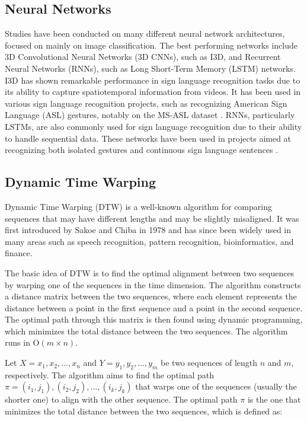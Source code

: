 \documentclass[final,rdr32.tex]{subfiles}
\begin{document}
\subsection{Neural Networks}

Studies have been conducted on many different neural network architectures, focused
on mainly on image classification. The best performing networks include 3D Convolutional Neural Networks (3D CNNs), such as I3D, and Recurrent Neural Networks (RNNs), such as Long Short-Term Memory (LSTM) networks. I3D has shown remarkable performance in sign language recognition tasks due to its ability to capture spatiotemporal information from videos. It has been used in various sign language recognition projects, such as recognizing American Sign Language (ASL) gestures, notably on the MS-ASL dataset \cite{joze2018ms}. RNNs, particularly LSTMs, are also commonly used for sign language recognition due to their ability to handle sequential data. These networks have been used in projects aimed at recognizing both isolated gestures \cite{liu2016sign} and continuous sign language sentences \cite{guo2018hierarchical}.

\subsection{Dynamic Time Warping}

Dynamic Time Warping (DTW) is a well-known algorithm for comparing sequences that may have different lengths and may be slightly misaligned. It was first introduced by Sakoe and Chiba in 1978 \cite{sakoe1978dynamic} and has since been widely used in many areas such as speech recognition, pattern recognition, bioinformatics, and finance.

The basic idea of DTW is to find the optimal alignment between two sequences by warping one of the sequences in the time dimension. The algorithm constructs a distance matrix between the two sequences, where each element represents the distance between a point in the first sequence and a point in the second sequence. The optimal path through this matrix is then found using dynamic programming, which minimizes the total distance between the two sequences. The algorithm runs in O$(m \times n)$.

Let $X = {x_1, x_2, ..., x_{n}}$ and $Y = {y_1, y_2, ..., y_{m}}$ be two sequences of length $n$ and $m$, respectively. The algorithm aims to find the optimal path $\pi = {(i_1,j_1),(i_2,j_2),...,(i_k,j_k)}$ that warps one of the sequences (usually the shorter one) to align with the other sequence. The optimal path $\pi$ is the one that minimizes the total distance between the two sequences, which is defined as:
\end{document}
